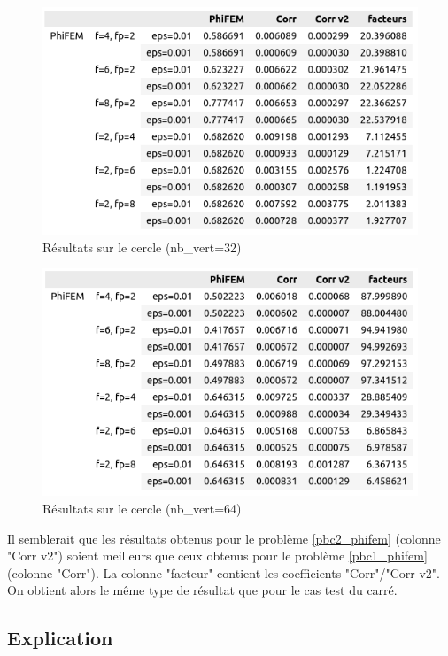 \documentclass[french]{article}
\begin{document}
	\begin{minipage}{0.48\linewidth}
		\begin{figure}[H]
			\centering
			\includegraphics[width=0.9\linewidth]{phifem_cercle_32.png}
			\caption{Résultats sur le cercle (nb\_vert=32)}
		\end{figure}
	\end{minipage}
	\begin{minipage}{0.48\linewidth}
		\begin{figure}[H]
			\centering
			\includegraphics[width=0.9\linewidth]{phifem_cercle_64.png}
			\caption{Résultats sur le cercle (nb\_vert=64)}
		\end{figure}
	\end{minipage}
	
	Il semblerait que les résultats obtenus pour le problème \ref{pbc2_phifem} (colonne "Corr v2") soient meilleurs que ceux obtenus pour le problème \ref{pbc1_phifem} (colonne "Corr"). La colonne "facteur" contient les coefficients "Corr"/"Corr v2". On obtient alors le même type de résultat que pour le cas test du carré.
	
	\subsection{Explication}
	
\end{document}
